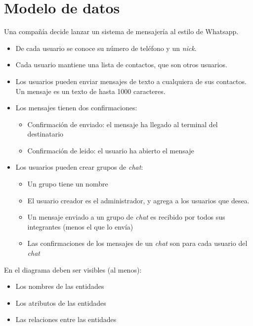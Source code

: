 \section{Modelo de datos}
Una compañía decide lanzar un sistema de mensajería al estilo de Whatsapp.
\begin{itemize}
\item De cada usuario se conoce su número de teléfono y un \textit{nick}.
\item Cada usuario mantiene una lista de contactos, que son otros usuarios.
\item Los usuarios pueden enviar mensajes de texto a cualquiera de sus contactos. Un mensaje es un texto de hasta 1000 caracteres.
\item Los mensajes tienen dos confirmaciones:
  \begin{itemize}
  \item Confirmación de enviado: el mensaje ha llegado al terminal del destinatario
  \item Confirmación de leido: el usuario ha abierto el mensaje
  \end{itemize}
  
  
\item Los usuarios pueden crear grupos de \textit{chat}:
  \begin{itemize}
  \item Un grupo tiene un nombre
  \item El usuario creador es el administrador, y agrega a los usuarios que desea.
  \item Un mensaje enviado a un grupo de \textit{chat} es recibido por todos sus integrantes (menos el que lo envía)
  \item Las confirmaciones de los mensajes de un \textit{chat} son para cada usuario del \textit{chat}
  \end{itemize}
  
\end{itemize}



\begin{homeworkProblem}
  En el diagrama deben ser visibles (al menos):
  \begin{itemize}
  \item Los nombres de las entidades
  \item Los atributos de las entidades
  \item Las relaciones entre las entidades
  \end{itemize}

\end{homeworkProblem}


